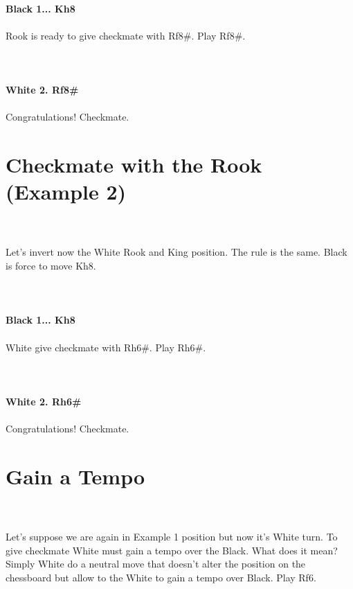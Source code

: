 \documentclass{article}
\begin{document}
\\
\textbf{Black 1... Kh8}\\
\\
Rook is ready to give checkmate with Rf8\#. Play Rf8\#.\\
\\

\\
\\
\textbf{White 2. Rf8\#}\\
\\
Congratulations! Checkmate.\section{ Checkmate with the Rook (Example 2)}

\\
\\
Let's invert now the White Rook and King position. The rule is the same. Black is force to move Kh8.\\
\\

\\
\\
\textbf{Black 1... Kh8}\\
\\
White give checkmate with Rh6\#. Play Rh6\#.\\
\\

\\
\\
\textbf{White 2. Rh6\#}\\
\\
Congratulations! Checkmate.\section{ Gain a Tempo}

\\
\\
Let's suppose we are again in Example 1 position but now it's White turn. To give checkmate White must gain a tempo over the Black. What does it mean? Simply White do a neutral move that doesn't alter the position on the chessboard but allow to the White to gain a tempo over Black. Play Rf6.\\
\\

\end{document}
